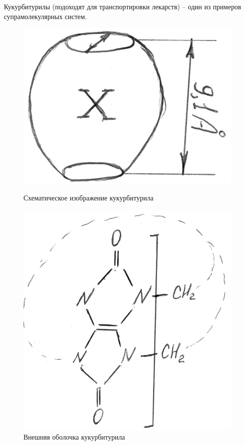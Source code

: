 \begin{lecture}
\begin{lecSection}
		\begin{lecSection}
			Кукурбитурилы (подоходят для транспортировки лекарств) -- один из примеров \\ супрамолекулярных систем.
			\begin{figure}[H]
				\begin{minipage}[h]{0.48\linewidth}
					\centering\includegraphics[width=\linewidth]{lecture_08/new_kukur_scheme}
					\caption{Схематическое изображение кукурбитурила}
				\end{minipage}
				\hfill
				\begin{minipage}[h]{0.48\linewidth}
					\centering\includegraphics[width=0.8\linewidth]{lecture_08/new_kukur_border}
					\caption{Внешняя оболочка кукурбитурила}
				\end{minipage}
				\hfill
			\end{figure}
		

\end{lecSection}
\end{lecSection}
\end{lecture}
